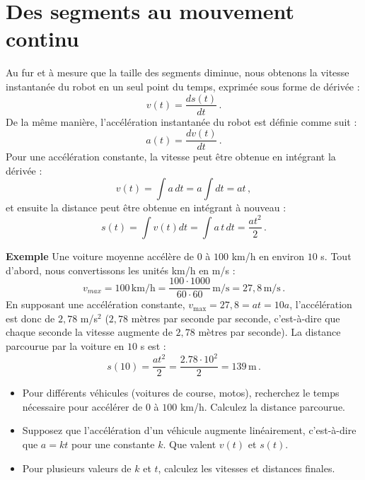 \section{Des segments au mouvement continu}\label{s.continuous}

Au fur et à mesure que la taille des segments diminue, nous obtenons la vitesse instantanée du robot en un seul point du temps, exprimée sous forme de dérivée :
\[v(t) = \frac{ds(t)}{dt}\,.\]
De la même manière, l'accélération instantanée du robot est définie comme suit :
\[a(t) = \frac{dv(t)}{dt}\,.\]
Pour une accélération constante, la vitesse peut être obtenue en intégrant la dérivée :
\[v(t) = \int a\, dt = a\int {dt} = at\,,\]
et ensuite la distance peut être obtenue en intégrant à nouveau :
\[s(t) = \int v(t) dt=\int a\,t\,dt = \frac{at^2}{2}\,.\]

\noindent{}\textbf{Exemple} Une voiture moyenne accélère de $0$ à $100$ km/h en environ $10$ s. Tout d'abord, nous convertissons les unités km/h en m/s :
\[
v_{\textit{max}} = 100\, \textrm{km/h} = \frac{100\cdot 1000}{60\cdot 60} \,\textrm{m/s} = 27,8 \,\textrm{m/s}\,.
\]
En supposant une accélération constante, $v_{\textrm{max}} = 27,8 = at = 10a$, l'accélération est donc de $2,78$ m/s$^{2}$ ($2,78$ mètres par seconde par seconde, c'est-à-dire que chaque seconde la vitesse augmente de $2,78$ mètres par seconde). La distance parcourue par la voiture en $10$ s est :
\[s(10) = \frac{at^2}{2} = \frac{2.78\cdot 10^2}{2}= 139 \,\textrm{m}\,.\]

\begin{framed}
\begin{itemize}
\item Pour différents véhicules (voitures de course, motos), recherchez le temps nécessaire pour accélérer de $0$ à $100$ km/h. Calculez la distance parcourue.
\item Supposez que l'accélération d'un véhicule augmente linéairement, c'est-à-dire que $a=kt$ pour une constante $k$. Que valent $v(t)$ et $s(t)$.
\item Pour plusieurs valeurs de $k$ et $t$, calculez les vitesses et distances finales.
\end{itemize}
\end{framed}

